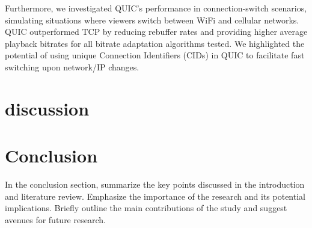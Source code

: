 \documentclass{article}
\begin{document}
Furthermore, we investigated QUIC's performance in connection-switch scenarios, simulating situations where viewers switch between WiFi and cellular networks. QUIC outperformed TCP by reducing rebuffer rates and providing higher average playback bitrates for all bitrate adaptation algorithms tested. We highlighted the potential of using unique Connection Identifiers (CIDs) in QUIC to facilitate fast switching upon network/IP changes.
\section{discussion}

\section{Conclusion}
In the conclusion section, summarize the key points discussed in the introduction and literature review. Emphasize the importance of the research and its potential implications. Briefly outline the main contributions of the study and suggest avenues for future research.
\end{document}
